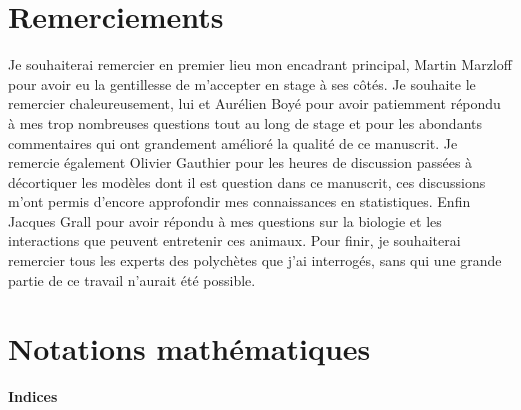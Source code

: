 
\hypertarget{remerciements}{%
\section{Remerciements}\label{remerciements}}

Je souhaiterai remercier en premier lieu mon encadrant principal, Martin
Marzloff pour avoir eu la gentillesse de m'accepter en stage à ses
côtés. Je souhaite le remercier chaleureusement, lui et Aurélien Boyé
pour avoir patiemment répondu à mes trop nombreuses questions tout au
long de stage et pour les abondants commentaires qui ont grandement
amélioré la qualité de ce manuscrit. Je remercie également Olivier
Gauthier pour les heures de discussion passées à décortiquer les modèles
dont il est question dans ce manuscrit, ces discussions m'ont permis
d'encore approfondir mes connaissances en statistiques. Enfin Jacques
Grall pour avoir répondu à mes questions sur la biologie et les
interactions que peuvent entretenir ces animaux. Pour finir, je
souhaiterai remercier tous les experts des polychètes que j'ai
interrogés, sans qui une grande partie de ce travail n'aurait été
possible.

\hypertarget{notations-mathuxe9matiques}{%
\section{Notations mathématiques}\label{notations-mathuxe9matiques}}

\textbf{Indices}

